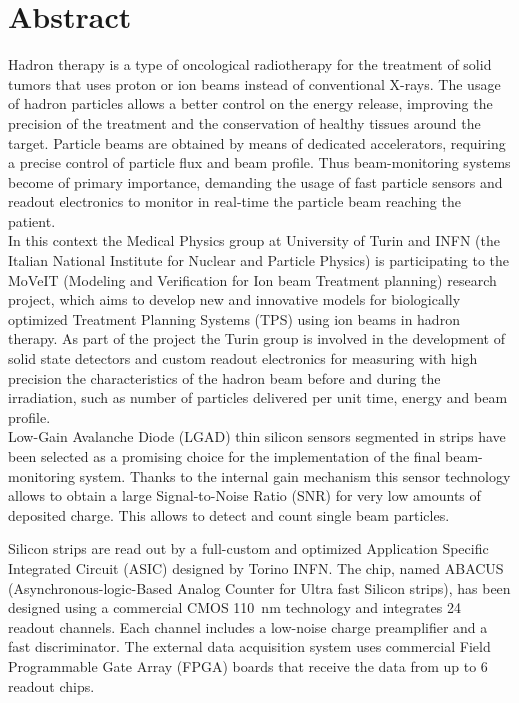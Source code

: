 
\chapter*{Abstract}
\thispagestyle{plain}
Hadron therapy is a type of oncological radiotherapy for the treatment of solid tumors that uses proton or
ion beams instead of conventional X-rays. The usage of hadron particles allows a better control on the energy release,
improving the precision of the treatment and the conservation of healthy tissues around the target.
Particle beams are obtained by means of dedicated accelerators, requiring a precise control of particle flux and beam profile.
Thus beam-monitoring systems become of primary importance, demanding the usage of fast particle sensors and readout electronics to monitor
in real-time the particle beam reaching the patient.\\

In this context the Medical Physics group at University of Turin and INFN (the Italian National Institute for
Nuclear and Particle Physics) is participating to the MoVeIT (Modeling and Verification for Ion beam Treatment planning) research project, which aims to develop new and
innovative models for biologically optimized Treatment Planning Systems (TPS) using ion beams in hadron therapy.
As part of the project the Turin group is involved in the development of solid state detectors and custom readout electronics for measuring with high precision
the characteristics of the hadron beam before and during the irradiation, such as number of particles delivered per unit time, energy and beam profile.\\

Low-Gain Avalanche Diode (LGAD) thin silicon sensors segmented in strips have been selected as a promising choice for the implementation
of the final beam-monitoring system. Thanks to the internal gain mechanism this sensor technology allows to obtain a large
Signal-to-Noise Ratio (SNR) for very low amounts of deposited charge. This allows to detect and count single beam particles.

\noindent Silicon strips are read out by a full-custom and optimized Application Specific Integrated Circuit (ASIC) designed by Torino INFN.
The chip, named ABACUS (Asynchronous-logic-Based Analog Counter for Ultra fast Silicon strips), has been 
designed using a commercial CMOS 110~nm technology and integrates 24 readout channels. Each channel includes a low-noise charge preamplifier 
and a fast discriminator. The external data acquisition system uses commercial Field Programmable Gate Array (FPGA) boards that receive
the data from up to 6 readout chips.\\%

